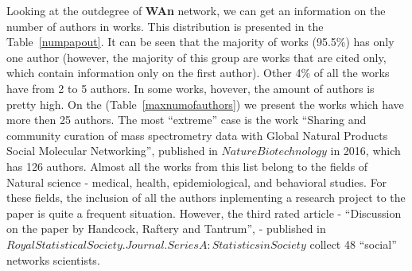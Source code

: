 \documentclass[11pt]{article} %
\begin{document}
Looking at the outdegree of \textbf{WAn} network, we can get an information on the number of authors in works. This distribution is presented in the Table~\ref{numpapout}. It can be seen that the majority of works (95.5\%) has only one author (however, the majority of this group are works that are cited only, which contain information only on the first author). Other 4\% of all the works have from 2 to 5 authors. In some works, hovever, the amount of authors is pretty high. On the (Table~\ref{maxnumofauthors}) we present the works which have more then 25 authors. The most ``extreme'' case is the work ``Sharing and community curation of mass spectrometry data with Global Natural Products Social Molecular Networking'', published in $Nature Biotechnology$ in 2016, which has 126 authors. Almost all the works from this list belong to the fields of Natural science - medical, health, epidemiological, and behavioral studies. For these fields, the inclusion of all the authors inplementing a research project to the paper is quite a frequent situation.  However, the third rated article - ``Discussion on the paper by Handcock, Raftery and Tantrum'', - published in $Royal Statistical Society. Journal. Series A : Statistics in Society$ collect 48 ``social'' networks scientists.\medskip
\end{document}
